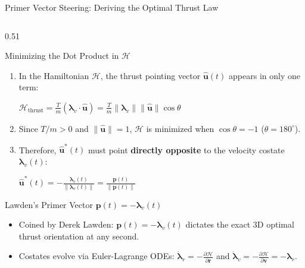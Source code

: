 \documentclass[aspectratio=169, 10pt]{beamer}
\begin{document}
\begin{frame}{Primer Vector Steering: Deriving the Optimal Thrust Law}
    \begin{columns}[T]
        \begin{column}{0.51\textwidth}
            \begin{block}{Minimizing the Dot Product in $\mathcal{H}$}
                \scriptsize
                \begin{enumerate}\setlength{\itemsep}{1.5pt}\setlength{\topsep}{0pt}
                    \item In the Hamiltonian $\mathcal{H}$, the thrust pointing vector $\hat{\mathbf{u}}(t)$ appears in only one term:
                    \par\vspace{1pt}
                    {\centering $\displaystyle \mathcal{H}_{\text{thrust}} = \frac{T}{m}\left(\boldsymbol{\lambda}_v \cdot \hat{\mathbf{u}}\right) = \frac{T}{m}\|\boldsymbol{\lambda}_v\| \|\hat{\mathbf{u}}\| \cos\theta$ \par}
                    \vspace{1pt}
                    \item Since $T/m > 0$ and $\|\hat{\mathbf{u}}\| = 1$, $\mathcal{H}$ is minimized when $\cos\theta = -1$ ($\theta = 180^\circ$).
                    \item Therefore, $\hat{\mathbf{u}}^*(t)$ must point \textbf{directly opposite} to the velocity costate $\boldsymbol{\lambda}_v(t)$:
                    \par\vspace{1.5pt}
                    {\centering $\displaystyle \hat{\mathbf{u}}^*(t) = -\frac{\boldsymbol{\lambda}_v(t)}{\|\boldsymbol{\lambda}_v(t)\|} = \frac{\mathbf{p}(t)}{\|\mathbf{p}(t)\|}$ \par}
                \end{enumerate}
            \end{block}
            \vspace{-0.18cm}
            \begin{exampleblock}{Lawden's Primer Vector $\mathbf{p}(t) = -\boldsymbol{\lambda}_v(t)$}
                \scriptsize
                \begin{itemize}\setlength{\itemsep}{1pt}\setlength{\topsep}{0pt}
                    \item Coined by Derek Lawden: $\mathbf{p}(t) = -\boldsymbol{\lambda}_v(t)$ dictates the exact 3D optimal thrust orientation at any second.
                    \item Costates evolve via Euler-Lagrange ODEs: $\dot{\boldsymbol{\lambda}}_r = -\frac{\partial \mathcal{H}}{\partial \mathbf{r}}$ and $\dot{\boldsymbol{\lambda}}_v = -\frac{\partial \mathcal{H}}{\partial \mathbf{v}} = -\boldsymbol{\lambda}_r$.
                \end{itemize}
            \end{exampleblock}
        \end{column}


\end{columns}
\end{frame}
\end{document}
